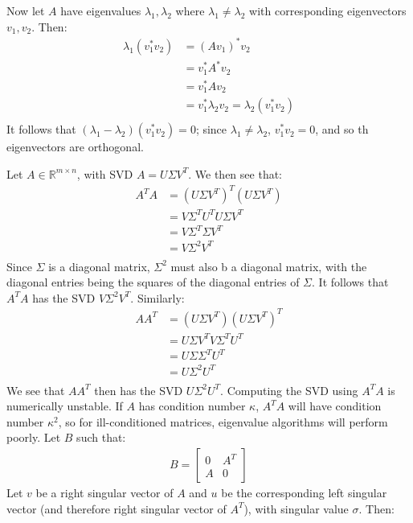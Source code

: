 \documentclass{article}
\begin{document}
Now let $A$ have eigenvalues $\lambda_1, \lambda_2$ where $\lambda_1 \neq \lambda_2$ with corresponding eigenvectors $v_1, v_2$. Then:
\begin{align*}
    \lambda_1(v_1^*v_2) & = (Av_1)^*v_2 \\
    & = v_1^*A^*v_2 \\
    & = v_1^*Av_2 \\
    & = v_1^*\lambda_2 v_2 = \lambda_2(v_1^*v_2) \\
\end{align*}
It follows that $(\lambda_1 - \lambda_2)(v_1^*v_2) = 0$; since $\lambda_1 \neq \lambda_2$, $v_1^*v_2 = 0$, and so th eigenvectors are orthogonal.

\clearpage
\problem{}
Let $A \in \mathbb{R}^{m \times n}$, with SVD $A = U\Sigma V^T$. We then see that:
\begin{align*}
    A^TA & = (U\Sigma V^T)^T(U\Sigma V^T) \\
    & = V\Sigma^T U^TU\Sigma V^T \\
    & = V\Sigma^T \Sigma V^T \\
    & = V\Sigma^2 V^T \\
\end{align*}
Since $\Sigma$ is a diagonal matrix, $\Sigma^2$ must also b a diagonal matrix, with the diagonal entries being the squares of the diagonal entries of $\Sigma$. It follows that $A^TA$ has the SVD $V\Sigma^2 V^T$. Similarly:
\begin{align*}
    AA^T & = (U\Sigma V^T)(U\Sigma V^T)^T \\
    & = U\Sigma V^TV\Sigma^T U^T \\
    & = U\Sigma \Sigma^T U^T \\
    & = U\Sigma^2 U^T \\
\end{align*}
We see that $AA^T$ then has the SVD $U\Sigma^2 U^T$.
Computing the SVD using $A^TA$ is numerically unstable. If $A$ has condition number $\kappa$, $A^TA$ will have condition number $\kappa^2$, so for ill-conditioned matrices, eigenvalue algorithms will perform poorly.
Let $B$ such that:
\begin{align*}
    B = \begin{bmatrix}
    0 & A^T \\ A & 0
    \end{bmatrix}
\end{align*}
Let $v$ be a right singular vector of $A$ and $u$ be the corresponding left singular vector (and therefore right singular vector of $A^T$), with singular value $\sigma$. Then:
\end{document}
